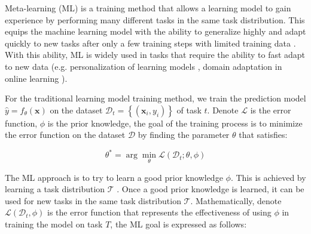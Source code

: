 Meta-learning (ML) is a training method that allows a learning model to gain experience by performing many different tasks in the same task distribution. This equips the machine learning model with the ability to generalize highly and adapt quickly to new tasks after only a few training steps with limited training data \cite{hospedales2021meta, vettoruzzo2024advances}. With this ability, ML is widely used in tasks that require the ability to fast adapt to new data (e.g. personalization of learning models \cite{chen2018federated, fallah2020personalized,nguyen2022meta}, domain adaptation in online learning \cite{hu2023meta, khoe2024domain}).


For the traditional learning model training method, we train the prediction model $\hat{y} = f_\theta(\mathbf{x})$ on the dataset $\mathcal{D}_t = \left\{ \left(\mathbf{x}_i, y_i \right) \right\}$ of task $t$. Denote $\mathcal{L}$ is the error function, $\phi$ is the prior knowledge, the goal of the training process is to minimize the error function on the dataset $\mathcal{D}$ by finding the parameter $\theta$ that satisfies:

\begin{equation}
    \theta^* = \arg\min_{\theta}{\mathcal{L}(\mathcal{D}_t; \theta, \phi)}
\end{equation}


The ML approach is to try to learn a good prior knowledge $\phi$. This is achieved by learning a task distribution $\mathcal{T}$ \cite{hospedales2021meta}. Once a good prior knowledge is learned, it can be used for new tasks in the same task distribution $\mathcal{T}$. Mathematically, denote $\mathcal{L}(\mathcal{D}_t, \phi)$ is the error function that represents the effectiveness of using $\phi$ in training the model on task $T$, the ML goal is expressed as follows:

